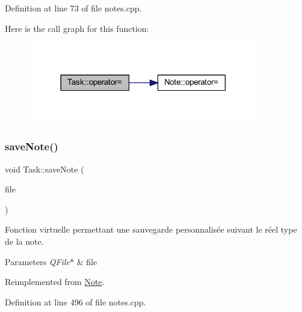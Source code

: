 Definition at line 73 of file notes.\+cpp.

Here is the call graph for this function\+:\nopagebreak
\begin{figure}[H]
\begin{center}
\leavevmode
\includegraphics[width=285pt]{class_task_a2430b942d050bf32c771821daa31493f_cgraph}
\end{center}
\end{figure}
\mbox{\label{class_task_a313eb342d047e8e5cab91bf51609a2f3}} 
\subsubsection{\texorpdfstring{save\+Note()}{saveNote()}}
{\footnotesize\ttfamily void Task\+::save\+Note (\begin{DoxyParamCaption}\item[{Q\+File $\ast$}]{file }\end{DoxyParamCaption})\hspace{0.3cm}{\ttfamily [virtual]}}



Fonction virtuelle permettant une sauvegarde personnalisée suivant le réel type de la note. 


\begin{DoxyParams}{Parameters}
{\em Q\+File$\ast$} & file \\
\hline
\end{DoxyParams}


Reimplemented from \hyperlink{class_note_a0c2cc72d7f3235c665a30ef915c5c58d}{Note}.



Definition at line 496 of file notes.\+cpp.

